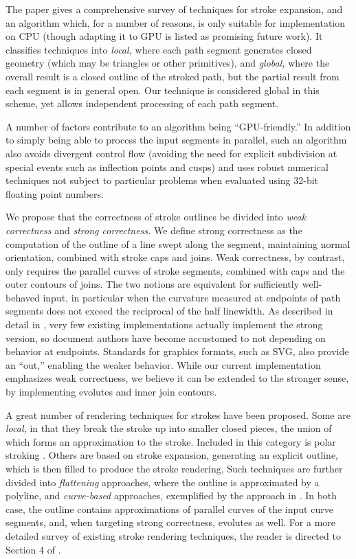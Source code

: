\documentclass[sigconf, authordraft]{acmart}
\begin{document}
The \cite{Nehab2020} paper gives a comprehensive survey of techniques for stroke expansion, and an algorithm which, for a number of reasons, is only suitable for implementation on CPU (though adapting it to GPU is listed as promising future work). It classifies techniques into \emph{local,} where each path segment generates closed geometry (which may be triangles or other primitives), and \emph{global,} where the overall result is a closed outline of the stroked path, but the partial result from each segment is in general open. Our technique is considered global in this scheme, yet allows independent processing of each path segment.

A number of factors contribute to an algorithm being ``GPU-friendly.'' In addition to simply being able to process the input segments in parallel, such an algorithm also avoids divergent control flow (avoiding the need for explicit subdivision at special events such as inflection points and cusps) and uses robust numerical techniques not subject to particular problems when evaluated using 32-bit floating point numbers.

We propose that the correctness of stroke outlines be divided into \emph{weak correctness} and \emph{strong correctness.} We define strong correctness as the computation of the outline of a line swept along the segment, maintaining normal orientation, combined with stroke caps and joins. Weak correctness, by contrast, only requires the parallel curves of stroke segments, combined with caps and the outer contours of joins. The two notions are equivalent for sufficiently well-behaved input, in particular when the curvature measured at endpoints of path segments does not exceed the reciprocal of the half linewidth. As described in detail in \cite{Nehab2020}, very few existing implementations actually implement the strong version, so document authors have become accustomed to not depending on behavior at endpoints. Standards for graphics formats, such as SVG\cite{Svg2}, also provide an ``out,'' enabling the weaker behavior. While our current implementation emphasizes weak correctness, we believe it can be extended to the stronger sense, by implementing evolutes and inner join contours.

A great number of rendering techniques for strokes have been proposed. Some are \emph{local,} in that they break the stroke up into smaller closed pieces, the union of which forms an approximation to the stroke. Included in this category is polar stroking \cite{Kilgard2020}. Others are based on stroke expansion, generating an explicit outline, which is then filled to produce the stroke rendering. Such techniques are further divided into \emph{flattening} approaches, where the outline is approximated by a polyline, and \emph{curve-based} approaches, exemplified by the approach in \cite{Nehab2020}. In both case, the outline contains approximations of parallel curves of the input curve segments, and, when targeting strong correctness, evolutes as well. For a more detailed survey of existing stroke rendering techniques, the reader is directed to Section 4 of \cite{Nehab2020}.
\end{document}
